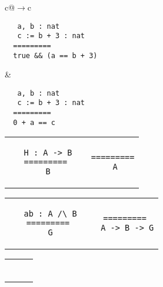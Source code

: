 \begin{landscape}
\begin{small}
\begin{multicols*}{3}[\begin{center}\section*{}\end{center}]
\begin{tabular}{c@{$\to$}c}
  \end{tabular}
  \begin{tabular}{c@{$\to$}c} 
  \begin{minipage}{0.15\textwidth}\begin{lstlisting}
   a, b : nat
   c := b + 3 : nat
  =========
  true && (a == b + 3)
  \end{lstlisting}\end{minipage}
  &
  \begin{minipage}{0.15\textwidth}\begin{lstlisting}
   a, b : nat
   c := b + 3 : nat
  =========
  0 + a == c
  \end{lstlisting}\end{minipage}
  \end{tabular}
  \begin{tabular}{c@{$\to$}c} 
  \begin{minipage}{0.15\textwidth}\begin{lstlisting}
   H : A -> B
  =========
   B
  \end{lstlisting}\end{minipage}
  &
  \begin{minipage}{0.15\textwidth}\begin{lstlisting}
  =========
   A
  \end{lstlisting}\end{minipage}
  \end{tabular}
  \begin{tabular}{c@{$\to$}c} 
  \begin{minipage}{0.15\textwidth}\begin{lstlisting}
   ab : A /\ B
  =========
   G
  \end{lstlisting}\end{minipage}
  &
  \begin{minipage}{0.15\textwidth}\begin{lstlisting}
  =========
   A -> B -> G
  \end{lstlisting}\end{minipage}
  \end{tabular}
  \begin{tabular}{c@{$\to$}cc} 
  \begin{minipage}{0.10\textwidth}\begin{lstlisting}

\end{lstlisting}
\end{minipage}
\end{tabular}
\end{multicols*}
\end{small}
\end{landscape}
